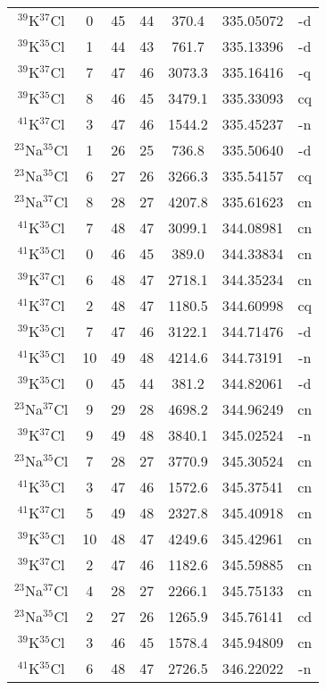 \begin{table*}[htp]
\begin{tabular}{ccccccc}
$^{39}$K$^{37}$Cl & 0 & 45 & 44 & 370.4 & 335.05072 & -d \\
$^{39}$K$^{35}$Cl & 1 & 44 & 43 & 761.7 & 335.13396 & -d \\
$^{39}$K$^{37}$Cl & 7 & 47 & 46 & 3073.3 & 335.16416 & -q \\
$^{39}$K$^{35}$Cl & 8 & 46 & 45 & 3479.1 & 335.33093 & cq \\
$^{41}$K$^{37}$Cl & 3 & 47 & 46 & 1544.2 & 335.45237 & -n \\
$^{23}$Na$^{35}$Cl & 1 & 26 & 25 & 736.8 & 335.50640 & -d \\
$^{23}$Na$^{35}$Cl & 6 & 27 & 26 & 3266.3 & 335.54157 & cq \\
$^{23}$Na$^{37}$Cl & 8 & 28 & 27 & 4207.8 & 335.61623 & cn \\
$^{41}$K$^{35}$Cl & 7 & 48 & 47 & 3099.1 & 344.08981 & cn \\
$^{41}$K$^{35}$Cl & 0 & 46 & 45 & 389.0 & 344.33834 & cn \\
$^{39}$K$^{37}$Cl & 6 & 48 & 47 & 2718.1 & 344.35234 & cn \\
$^{41}$K$^{37}$Cl & 2 & 48 & 47 & 1180.5 & 344.60998 & cq \\
$^{39}$K$^{35}$Cl & 7 & 47 & 46 & 3122.1 & 344.71476 & -d \\
$^{41}$K$^{35}$Cl & 10 & 49 & 48 & 4214.6 & 344.73191 & -n \\
$^{39}$K$^{35}$Cl & 0 & 45 & 44 & 381.2 & 344.82061 & -d \\
$^{23}$Na$^{37}$Cl & 9 & 29 & 28 & 4698.2 & 344.96249 & cn \\
$^{39}$K$^{37}$Cl & 9 & 49 & 48 & 3840.1 & 345.02524 & -n \\
$^{23}$Na$^{35}$Cl & 7 & 28 & 27 & 3770.9 & 345.30524 & cn \\
$^{41}$K$^{35}$Cl & 3 & 47 & 46 & 1572.6 & 345.37541 & cn \\
$^{41}$K$^{37}$Cl & 5 & 49 & 48 & 2327.8 & 345.40918 & cn \\
$^{39}$K$^{35}$Cl & 10 & 48 & 47 & 4249.6 & 345.42961 & cn \\
$^{39}$K$^{37}$Cl & 2 & 47 & 46 & 1182.6 & 345.59885 & cn \\
$^{23}$Na$^{37}$Cl & 4 & 28 & 27 & 2266.1 & 345.75133 & cn \\
$^{23}$Na$^{35}$Cl & 2 & 27 & 26 & 1265.9 & 345.76141 & cd \\
$^{39}$K$^{35}$Cl & 3 & 46 & 45 & 1578.4 & 345.94809 & cn \\
$^{41}$K$^{35}$Cl & 6 & 48 & 47 & 2726.5 & 346.22022 & -n \\

\end{tabular}
\end{table*}
